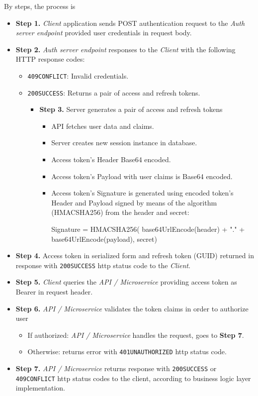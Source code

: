 By steps, the process is
\begin{itemize}
    \item \textbf{Step 1.} \textit{Client} application sends POST authentication request to
    the \textit{Auth server endpoint} provided user credentials in request body.
    \item \textbf{Step 2.} \textit{Auth server endpoint} responses to the \textit{Client} with the following HTTP response codes:
    \begin{itemize}
        \item \texttt{409CONFLICT}: Invalid credentials.
        \item \texttt{200SUCCESS}: Returns a pair of access and refresh tokens.
        \begin{itemize}
            \item \textbf{Step 3.} Server generates a pair of access and refresh tokens
            \begin{itemize}
                \item API fetches user data and claims.
                \item Server creates new session instance in database.
                \item Access token's Header Base64 encoded.
                \item Access token's Payload with user claims is Base64 encoded.
                \item Access token's Signature is generated using encoded token's Header and Payload signed by means of the
                algorithm (HMACSHA256) from the header and secret:
                \begin{spverbatim}
                    Signature = HMACSHA256(
                    base64UrlEncode(header) + "." +
                    base64UrlEncode(payload),
                    secret)
                \end{spverbatim}
            \end{itemize}
        \end{itemize}
    \end{itemize}
    \item \textbf{Step 4.} Access token in serialized form and refresh token (GUID) returned in response with
    \texttt{200SUCCESS} http status code to the \textit{Client}.
    \item \textbf{Step 5.} \textit{Client} queries the \textit{API / Microservice} providing access token as
    Bearer in request header.
    \item \textbf{Step 6.} \textit{API / Microservice} validates the token claims in order to authorize user
    \begin{itemize}
        \item If authorized: \textit{API / Microservice} handles the request, goes to \textbf{Step 7}.
        \item Otherwise: returns error with \texttt{401UNAUTHORIZED} http status code.
    \end{itemize}
    \item \textbf{Step 7.} \textit{API / Microservice} returns response with \texttt{200SUCCESS} or \texttt{409CONFLICT}
    http status codes to the client, according to business logic layer implementation.
\end{itemize}